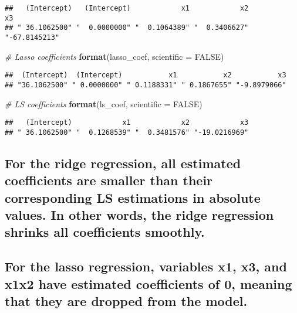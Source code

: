 \documentclass[
]{article}
\newenvironment{Shaded}{\begin{snugshade}}{\end{snugshade}}
\newcommand{\CommentTok}[1]{\textcolor[rgb]{0.56,0.35,0.01}{\textit{#1}}}
\newcommand{\DataTypeTok}[1]{\textcolor[rgb]{0.13,0.29,0.53}{#1}}
\newcommand{\KeywordTok}[1]{\textcolor[rgb]{0.13,0.29,0.53}{\textbf{#1}}}
\newcommand{\NormalTok}[1]{#1}
\newcommand{\OtherTok}[1]{\textcolor[rgb]{0.56,0.35,0.01}{#1}}
\begin{document}
\begin{verbatim}
##   (Intercept)   (Intercept)            x1            x2            x3 
## " 36.1062500" "  0.0000000" "  0.1064389" "  0.3406627" "-67.8145213"
\end{verbatim}

\begin{Shaded}
\begin{Highlighting}[]
\CommentTok{# Lasso coefficients}
\KeywordTok{format}\NormalTok{(lasso_coef, }\DataTypeTok{scientific =} \OtherTok{FALSE}\NormalTok{)}
\end{Highlighting}
\end{Shaded}

\begin{verbatim}
##  (Intercept)  (Intercept)           x1           x2           x3 
## "36.1062500" " 0.0000000" " 0.1188331" " 0.1867655" "-9.8979066"
\end{verbatim}

\begin{Shaded}
\begin{Highlighting}[]
\CommentTok{# LS coefficients}
\KeywordTok{format}\NormalTok{(ls_coef, }\DataTypeTok{scientific =} \OtherTok{FALSE}\NormalTok{)}
\end{Highlighting}
\end{Shaded}

\begin{verbatim}
##   (Intercept)            x1            x2            x3 
## " 36.1062500" "  0.1268539" "  0.3481576" "-19.0216969"
\end{verbatim}

\hypertarget{for-the-ridge-regression-all-estimated-coefficients-are-smaller-than-their-corresponding-ls-estimations-in-absolute-values.-in-other-words-the-ridge-regression-shrinks-all-coefficients-smoothly.}{%
\subsection{For the ridge regression, all estimated coefficients are
smaller than their corresponding LS estimations in absolute values. In
other words, the ridge regression shrinks all coefficients
smoothly.}\label{for-the-ridge-regression-all-estimated-coefficients-are-smaller-than-their-corresponding-ls-estimations-in-absolute-values.-in-other-words-the-ridge-regression-shrinks-all-coefficients-smoothly.}}

\hypertarget{for-the-lasso-regression-variables-x1-x3-and-x1x2-have-estimated-coefficients-of-0-meaning-that-they-are-dropped-from-the-model.}{%
\subsection{For the lasso regression, variables x1, x3, and x1x2 have
estimated coefficients of 0, meaning that they are dropped from the
model.}\label{for-the-lasso-regression-variables-x1-x3-and-x1x2-have-estimated-coefficients-of-0-meaning-that-they-are-dropped-from-the-model.}}
\end{document}
